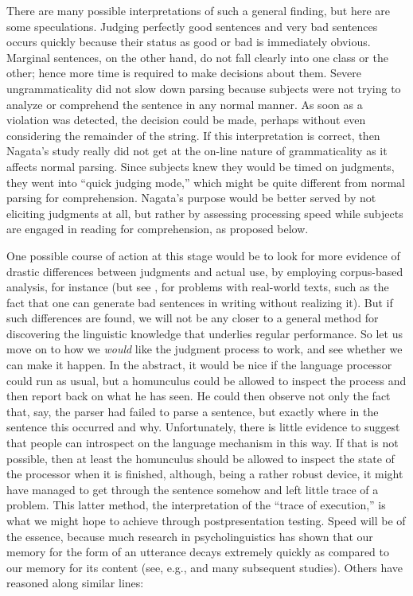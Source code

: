 There are many possible interpretations of such a general finding, but here are some speculations. Judging perfectly good sentences and very bad sentences occurs quickly because their status as good or bad is immediately obvious. Marginal sentences, on the other hand, do not fall clearly into one class or the other; hence more time is required to make decisions about them. Severe ungrammaticality did not slow down parsing because subjects were not trying to analyze or comprehend the sentence in any normal manner. As soon as a violation was detected, the decision could be made, perhaps without even considering the remainder of the string. If this interpretation is correct, then Nagata's study really did not get at the on-line nature of grammaticality as it affects normal parsing. Since subjects knew they would be timed on judgments, they went into ``quick judging mode,'' which might be quite different from normal parsing for comprehension. Nagata's purpose would be better served by not eliciting judgments at all, but rather by assessing processing speed while subjects are engaged in reading for comprehension, as proposed below.

One possible course of action at this stage would be to look for more evidence of drastic differences between judgments and actual use, by employing corpus-based analysis, for instance (but see \citet[55]{Hirst1981}, for problems with real-world texts, such as the fact that one can generate bad sentences in writing without realizing it). But if such differences are found, we will not be any closer to a general method for discovering the linguistic knowledge that underlies regular performance. So let us move on to how we \textit{would} like the judgment process to work, and see whether we can make it happen. In the abstract, it would be nice if the language processor could run as usual, but a homunculus could be allowed to inspect the process and then report back on what he has seen. He could then observe not only the fact that, say, the parser had failed to parse a sentence, but exactly where in the sentence this occurred and why. Unfortunately, there is little evidence to suggest that people can introspect on the language mechanism in this
way. If that is not possible, then at least the homunculus should be allowed to inspect the state of the processor when it is finished, although, being a rather robust device, it might have managed to get through the sentence somehow and left little trace of a problem. This latter method, the interpretation of the ``trace of execution,'' is what we might hope to achieve through postpresentation testing. Speed will be of the essence, because much research in psycholinguistics has shown that our memory for the form of an utterance decays extremely quickly as compared to our memory for its content (see, e.g., \citet{Sachs1967} and many subsequent studies). Others have reasoned along similar lines:

